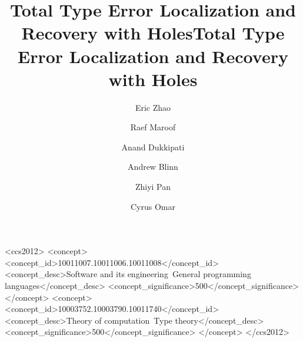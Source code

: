 \documentclass[acmsmall,prologue,dvipsnames]{acmart}
\begin{document}
\title{Total Type Error Localization and Recovery with Holes}

\title{Total Type Error Localization and Recovery with Holes}

\author{Eric Zhao}
\orcid{}

\author{Raef Maroof}
\orcid{}

\author{Anand Dukkipati}
\orcid{}

\author{Andrew Blinn}

\author{Zhiyi Pan}
\orcid{}

\author{Cyrus Omar}



\begin{CCSXML}
<ccs2012>
   <concept>
       <concept_id>10011007.10011006.10011008</concept_id>
       <concept_desc>Software and its engineering~General programming languages</concept_desc>
       <concept_significance>500</concept_significance>
       </concept>
   <concept>
       <concept_id>10003752.10003790.10011740</concept_id>
       <concept_desc>Theory of computation~Type theory</concept_desc>
       <concept_significance>500</concept_significance>
       </concept>
 </ccs2012>
\end{CCSXML}



\maketitle









\end{document}
